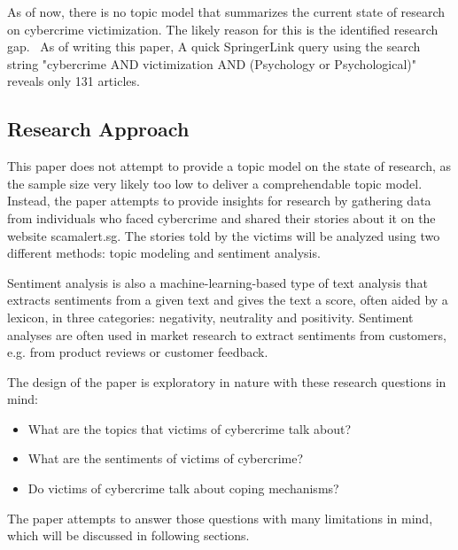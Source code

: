 \bigskip

As of now, there is no topic model that summarizes the current state of research on cybercrime victimization. The likely reason for this is the identified research gap.~\citep{horesearch} As of writing this paper, A quick SpringerLink query using the search string "cybercrime AND victimization AND (Psychology or Psychological)" reveals only 131 articles.

\subsection{Research Approach}

This paper does not attempt to provide a topic model on the state of research, as the sample size very likely too low to deliver a comprehendable topic model. 
Instead, the paper attempts to provide insights for research by gathering data from individuals who faced cybercrime and shared their stories about it on the website scamalert.sg. The stories told by the victims will be analyzed using two different methods: topic modeling and sentiment analysis.

Sentiment analysis is also a machine-learning-based type of text analysis that extracts sentiments from a given text and gives the text a score, often aided by a lexicon, in three categories: negativity, neutrality and positivity. Sentiment analyses are often used in market research to extract sentiments from customers, e.g. from product reviews or customer feedback.~\cite{rambocas2013marketing}

\bigskip

The design of the paper is exploratory in nature with these research questions in mind:

\begin{itemize}
    \item What are the topics that victims of cybercrime talk about?
    \item What are the sentiments of victims of cybercrime?
    \item Do victims of cybercrime talk about coping mechanisms?
\end{itemize}


The paper attempts to answer those questions with many limitations in mind, which will be discussed in following sections.